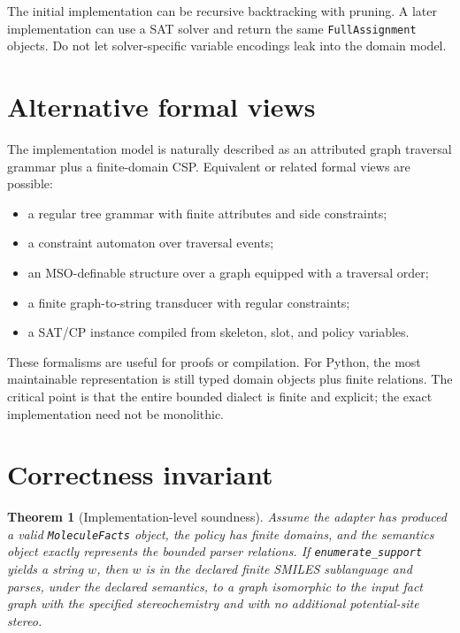 \documentclass[10pt,a4paper]{article}
\newtheorem{theorem}[lemma]{Theorem}
\theoremstyle{definition}
\theoremstyle{remark}
\begin{document}
The initial implementation can be recursive backtracking with pruning.  A later
implementation can use a SAT solver and return the same \texttt{FullAssignment}
objects.  Do not let solver-specific variable encodings leak into the domain
model.

\section{Alternative formal views}
\label{s:formalism}

The implementation model is naturally described as an attributed graph traversal
grammar plus a finite-domain CSP.  Equivalent or related formal views are
possible:
\begin{itemize}[leftmargin=*]
\item a regular tree grammar with finite attributes and side constraints;
\item a constraint automaton over traversal events;
\item an MSO-definable structure over a graph equipped with a traversal order;
\item a finite graph-to-string transducer with regular constraints;
\item a SAT/CP instance compiled from skeleton, slot, and policy variables.
\end{itemize}

These formalisms are useful for proofs or compilation.  For Python, the most
maintainable representation is still typed domain objects plus finite relations.
The critical point is that the entire bounded dialect is finite and explicit;
the exact implementation need not be monolithic.

\section{Correctness invariant}
\label{s:correctness}

\begin{theorem}[Implementation-level soundness]
Assume the adapter has produced a valid \texttt{MoleculeFacts} object, the policy
has finite domains, and the semantics object exactly represents the bounded
parser relations.  If \texttt{enumerate\_support} yields a string \(w\), then
\(w\) is in the declared finite SMILES sublanguage and parses, under the declared
semantics, to a graph isomorphic to the input fact graph with the specified
stereochemistry and with no additional potential-site stereo.
\end{theorem}
\end{document}
